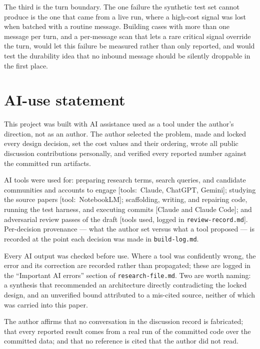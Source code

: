 \documentclass{article}
\begin{document}
The third is the turn boundary. The one failure the synthetic test set cannot
produce is the one that came from a live run, where a high-cost signal was lost
when batched with a routine message. Building cases with more than one message per
turn, and a per-message scan that lets a rare critical signal override the turn,
would let this failure be measured rather than only reported, and would test the
durability idea that no inbound message should be silently droppable in the first
place.
\section*{AI-use statement}

This project was built with AI assistance used as a tool under the author's
direction, not as an author. The author selected the problem, made and locked
every design decision, set the cost values and their ordering, wrote all public
discussion contributions personally, and verified every reported number against
the committed run artifacts.

AI tools were used for: preparing research terms, search queries, and candidate
communities and accounts to engage [tools:\ Claude, ChatGPT, Gemini]; studying the
source papers [tool:\ NotebookLM]; scaffolding, writing, and repairing code,
running the test harness, and executing commits [Claude and Claude Code]; and
adversarial review passes of the draft [tools used, logged in
\texttt{review-record.md}]. Per-decision provenance --- what the author set
versus what a tool proposed --- is recorded at the point each decision was made
in \texttt{build-log.md}.

Every AI output was checked before use. Where a tool was confidently wrong, the
error and its correction are recorded rather than propagated; these are logged in
the ``Important AI errors'' section of \texttt{research-file.md}. Two are worth
naming: a synthesis that recommended an architecture directly contradicting the
locked design, and an unverified bound attributed to a mis-cited source, neither
of which was carried into this paper.

The author affirms that no conversation in the discussion record is fabricated;
that every reported result comes from a real run of the committed code over the
committed data; and that no reference is cited that the author did not read.


\end{document}
